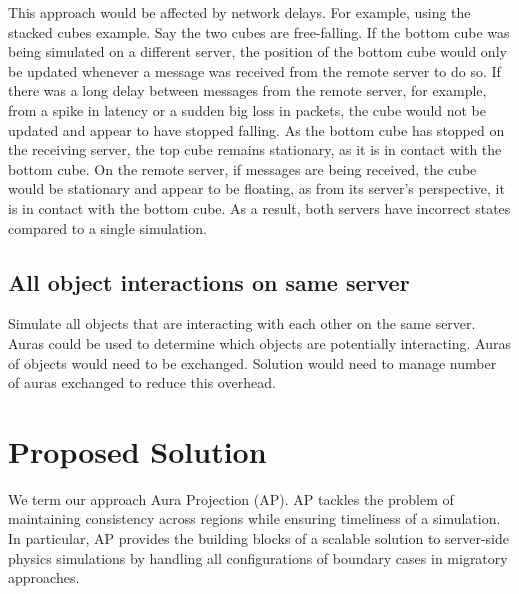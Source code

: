 
This approach would be affected by network delays. For example, using the stacked cubes example. Say the two cubes are free-falling. If the bottom cube was being simulated on a different server, the position of the bottom cube would only be updated whenever a message was received from the remote server to do so. If there was a long delay between messages from the remote server, for example, from a spike in latency or a sudden big loss in packets, the cube would not be updated and appear to have stopped falling. As the bottom cube has stopped on the receiving server, the top cube remains stationary, as it is in contact with the bottom cube. On the remote server, if messages are being received, the cube would be stationary and appear to be floating, as from its server's perspective, it is in contact with the bottom cube. As a result, both servers have incorrect states compared to a single simulation.


\subsection{All object interactions on same server}
Simulate all objects that are interacting with each other on the same server. Auras could be used to determine which objects are potentially interacting. Auras of objects would need to be exchanged. Solution would need to manage number of auras exchanged to reduce this overhead.

\section{Proposed Solution}
We term our approach Aura Projection (AP). AP tackles the problem of maintaining consistency across regions while ensuring timeliness of a simulation. In particular, AP provides the building blocks of a scalable solution to server-side physics simulations by handling all configurations of boundary cases in migratory approaches. 

